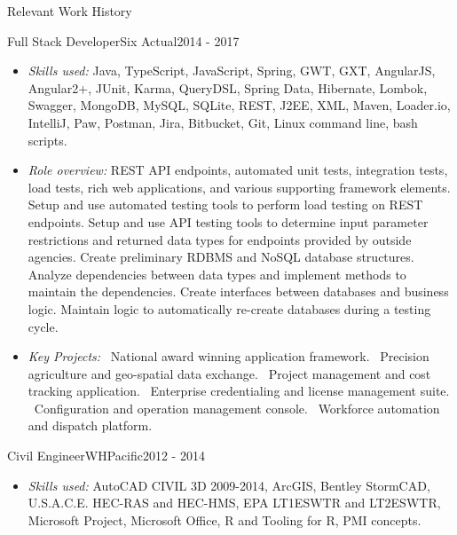 \documentclass[]{mcdowellcv}
\begin{document}
\begin{cvsection}{Relevant Work History}
	\begin{cvsubsection}{Full Stack Developer}{Six Actual}{2014 - 2017}
		\begin{itemize}  %
			\item \textit{Skills used:} Java, TypeScript, JavaScript, Spring, GWT, GXT, AngularJS, Angular2+, JUnit, Karma, QueryDSL, Spring Data, Hibernate, Lombok, Swagger, MongoDB, MySQL, SQLite, REST, J2EE, XML, Maven, Loader.io, IntelliJ, Paw, Postman, Jira, Bitbucket, Git, Linux command line, bash scripts.
			
			\item \textit{Role overview:}  
				 REST API endpoints, automated unit tests, integration tests, load tests, rich web applications, and various supporting framework elements.  
				 Setup and use automated testing tools to perform load testing on REST endpoints.  Setup and use API testing tools to determine input parameter restrictions and returned data types for endpoints provided by outside agencies.  
				  Create preliminary RDBMS and NoSQL database structures.  Analyze dependencies between data types and implement methods to maintain the dependencies.  Create interfaces between databases and business logic.  Maintain logic to automatically re-create databases during a testing cycle.
			
			\item \textit{Key Projects:}  
				\sbt\ National award winning application framework.
				\sbt\ Precision agriculture and geo-spatial data exchange.
				\sbt\ Project management and cost tracking application.
				\sbt\ Enterprise credentialing and license management suite.
				\sbt\ Configuration and operation management console.
				\sbt\ Workforce automation and dispatch platform.
		\end{itemize}
	\end{cvsubsection}
	
	\begin{cvsubsection}{Civil Engineer}{WHPacific}{2012 - 2014}
		\begin{itemize}
			\item \textit{Skills used:} AutoCAD CIVIL 3D 2009-2014, ArcGIS, Bentley StormCAD, U.S.A.C.E. HEC-RAS and HEC-HMS, EPA LT1ESWTR and LT2ESWTR, Microsoft Project, Microsoft Office, \textsf{R} and Tooling for \textsf{R}, PMI concepts.
			

\end{itemize}
\end{cvsubsection}
\end{cvsection}
\end{document}
